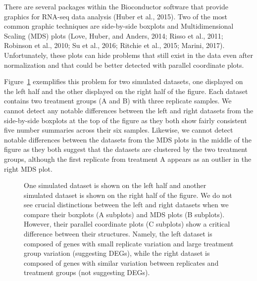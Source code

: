 \documentclass[referee]{biom}
\begin{document}
There are several packages within the Bioconductor software that provide graphics for RNA-seq data analysis (Huber et al., 2015). Two of the most common graphic techniques are side-by-side boxplots and Multidimensional Scaling (MDS) plots (Love, Huber, and Anders, 2014; Risso et al., 2011; Robinson et al., 2010; Su et al., 2016; Ritchie et al., 2015; Marini, 2017). Unfortunately, these plots can hide problems that still exist in the data even after normalization and that could be better detected with parallel coordinate plots.

Figure~\ref{2group} exemplifies this problem for two simulated datasets, one displayed on the left half and the other displayed on the right half of the figure. Each dataset contains two treatment groups (A and B) with three replicate samples. We cannot detect any notable differences between the left and right datasets from the side-by-side boxplots at the top of the figure as they both show fairly consistent five number summaries across their six samples. Likewise, we cannot detect notable differences between the datasets from the MDS plots in the middle of the figure as they both suggest that the datasets are clustered by the two treatment groups, although the first replicate from treatment A appears as an outlier in the right MDS plot.

\begin{figure}[t!]
\begin{center}
\centerline{}
\end{center}
\caption{One simulated dataset is shown on the left half and another simulated dataset is shown on the right half of the figure. We do not see crucial distinctions between the left and right datasets when we compare their boxplots (A subplots) and MDS plots (B subplots). However, their parallel coordinate plots (C subplots) show a critical difference between their structures. Namely, the left dataset is composed of genes with small replicate variation and large treatment group variation (suggesting DEGs), while the right dataset is composed of genes with similar variation between replicates and treatment groups (not suggesting DEGs). 
\label{2group}}
\end{figure}
\end{document}
